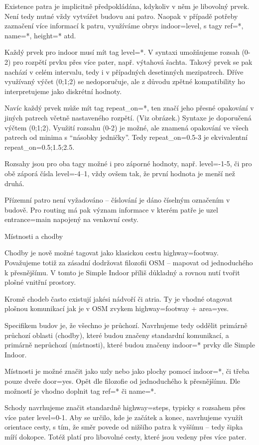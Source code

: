 Existence patra je implicitně předpokládána, kdykoliv v něm je libovolný prvek. Není tedy nutné vždy vytvářet budovu ani patro. Naopak v případě potřeby zaznačení více informací k patru, využíváme obrys indoor=level, s tagy ref=*, name=*, height=* atd.

Každý prvek pro indoor musí mít tag level=*. V syntaxi umožňujeme rozsah (0-2) pro rozpětí prvku přes více pater, např. výtahová šachta. Takový prvek se pak nachází v celém intervalu, tedy i v případných desetinných mezipatrech. Dříve využívaný výčet (0;1;2) se nedoporučuje, ale z důvodu zpětné kompatibility ho interpretujeme jako diskrétní hodnoty.

Navíc každý prvek může mít tag repeat\_on=*, ten značí jeho přesné opakování v jiných patrech včetně nastaveného rozpětí. (Viz obrázek.) Syntaxe je doporučená výčtem (0;1;2). Využití rozsahu (0-2) je možné, ale znamená opakování ve všech patrech od minima s “násobky jedničky”. Tedy repeat\_on=0.5-3  je ekvivalentní repeat\_on=0.5;1.5;2.5.

Rozsahy jsou pro oba tagy možné i pro záporné hodnoty, např. level=-1-5, či pro obě záporá čísla level=-4--1, vždy ovšem tak, že první hodnota je menší než druhá.

Přízemní patro není vyžadováno – číslování je dáno číselným označením v budově. Pro routing má pak význam informace v kterém patře je uzel entrance=main napojený na venkovní cesty.

Místnosti a chodby

Chodby je nově možné tagovat jako klasickou cestu highway=footway. Považujeme totiž za zásadní dodržovat filozofii OSM – mapovat od jednoduchého k přesnějšímu. V tomto je Simple Indoor příliš důkladný a rovnou nutí tvořit plošné vnitřní prostory.

Kromě chodeb často existují jakési nádvoří či atria. Ty je vhodné otagovat plošnou komunikací jak je v OSM zvykem highway=footway + area=yes.

Specifikem budov je, že všechno je průchozí. Navrhujeme tedy oddělit primárně průchozí oblasti (chodby), které budou značeny standardní komunikací, a primárně neprůchozí (místnosti), které budou značeny indoor=* prvky dle Simple Indoor.

Místnosti je možné značit jako uzly nebo jako plochy  pomocí indoor=*, či třeba pouze dveře door=yes. Opět dle filozofie od jednoduchého k přesnějšímu. Dle možností je vhodno doplnit tag ref=* či name=*.

Schody navrhujeme značit standardně highway=steps, typicky s rozsahem přes více pater level=0-1. Aby se určilo, kde je začátek a konec, navrhujeme využít orientace cesty, s tím, že směr povede od nižšího patra k vyššímu – tedy šipka míří dokopce. Totéž platí pro libovolné cesty, které jsou vedeny přes více pater.

